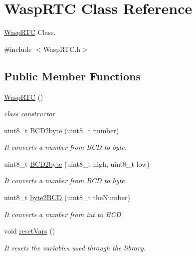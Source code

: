\hypertarget{class_wasp_r_t_c}{}\section{Wasp\+R\+TC Class Reference}
\label{class_wasp_r_t_c}


\hyperlink{class_wasp_r_t_c}{Wasp\+R\+TC} Class.  




{\ttfamily \#include $<$Wasp\+R\+T\+C.\+h$>$}

\subsection*{Public Member Functions}
\begin{DoxyCompactItemize}
\item 
\hyperlink{class_wasp_r_t_c_aef80633b0a26b22b0d0eec240a1575df}{Wasp\+R\+TC} ()
\begin{DoxyCompactList}\small\item\em class constructor \end{DoxyCompactList}\item 
uint8\+\_\+t \hyperlink{class_wasp_r_t_c_a8c8178ff8fbedd06dda5143bbfab3ef9}{B\+C\+D2byte} (uint8\+\_\+t number)
\begin{DoxyCompactList}\small\item\em It converts a number from B\+CD to byte. \end{DoxyCompactList}\item 
uint8\+\_\+t \hyperlink{class_wasp_r_t_c_a3736d3652382ab153bdd4387ee91d899}{B\+C\+D2byte} (uint8\+\_\+t high, uint8\+\_\+t low)
\begin{DoxyCompactList}\small\item\em It converts a number from B\+CD to byte. \end{DoxyCompactList}\item 
uint8\+\_\+t \hyperlink{class_wasp_r_t_c_a9f8cbe6f261ec1d08faf0ebd24d02b8a}{byte2\+B\+CD} (uint8\+\_\+t the\+Number)
\begin{DoxyCompactList}\small\item\em It converts a number from int to B\+CD. \end{DoxyCompactList}\item 
void \hyperlink{class_wasp_r_t_c_ac8df10139c5157e797836bad6d9ad62f}{reset\+Vars} ()
\begin{DoxyCompactList}\small\item\em It resets the variables used through the library. \end{DoxyCompactList}\item 

\end{DoxyCompactItemize}
